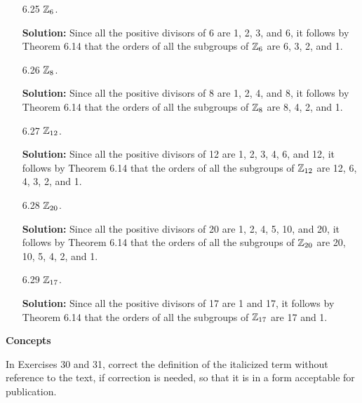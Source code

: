 \begin{enumerate}
   \item[6.25] $\mathbb{Z}_6$.

      \textbf{Solution:} Since all the positive divisors of 6 are 1, 2, 3, and
      6, it follows by Theorem 6.14 that the orders of all the subgroups of
      $\mathbb{Z}_6$ are 6, 3, 2, and 1.
   \item[6.26] $\mathbb{Z}_8$.

      \textbf{Solution:} Since all the positive divisors of 8 are 1, 2, 4, and
      8, it follows by Theorem 6.14 that the orders of all the subgroups of
      $\mathbb{Z}_8$ are 8, 4, 2, and 1.
   \item[6.27] $\mathbb{Z}_{12}$.

      \textbf{Solution:} Since all the positive divisors of 12 are 1, 2, 3, 4,
      6, and 12, it follows by Theorem 6.14 that the orders of all the subgroups 
      of $\mathbb{Z}_{12}$ are 12, 6, 4, 3, 2, and 1.
   \item[6.28] $\mathbb{Z}_{20}$.

      \textbf{Solution:} Since all the positive divisors of 20 are 1, 2, 4, 5, 
      10, and 20, it follows by Theorem 6.14 that the orders of all the 
      subgroups of $\mathbb{Z}_{20}$ are 20, 10, 5, 4, 2, and 1.
   \item[6.29] $\mathbb{Z}_{17}$.

      \textbf{Solution:} Since all the positive divisors of 17 are 1 and 17, it 
      follows by Theorem 6.14 that the orders of all the subgroups of $\mathbb{Z}_{17}$ 
      are 17 and 1.
\end{enumerate}

\noindent      \textbf{Concepts}

\noindent      In Exercises 30 and 31, correct the definition of the italicized
               term without reference to the text, if correction is needed, so
               that it is in a form acceptable for publication.

